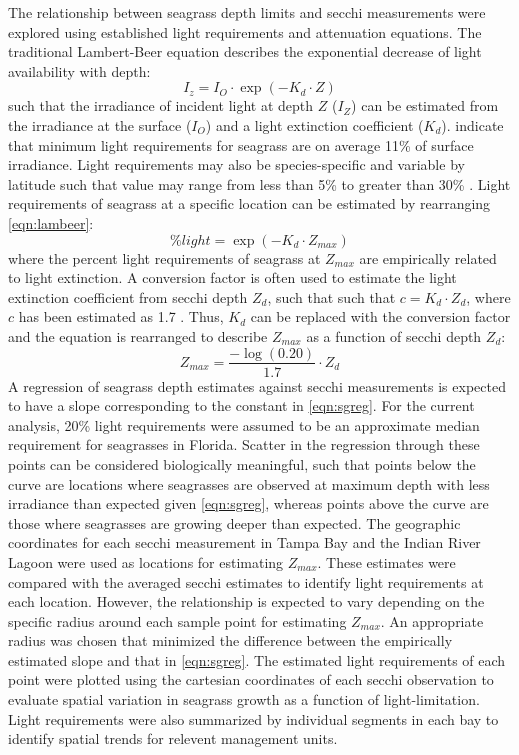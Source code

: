\documentclass[letterpaper,12pt,oneside]{article}\usepackage[]{graphicx}\usepackage[]{color}
\begin{document}
The relationship between seagrass depth limits and secchi measurements were explored using established light requirements and attenuation equations.  The traditional Lambert-Beer equation describes the exponential decrease of light availability with depth:
\begin{equation} \label{eqn:lambeer}
I_{z} = I_{O} \cdot \exp\left(-K_{d} \cdot Z\right)
\end{equation}
\noindent such that the irradiance of incident light at depth $Z$ ($I_{Z}$) can be estimated from the irradiance at the surface ($I_{O}$) and a light extinction coefficient ($K_{d}$). \citet{Duarte91} indicate that minimum light requirements for seagrass are on average 11\% of surface irradiance.  Light requirements may also be species-specific and variable by latitude such that value may range from less than 5\% to greater than 30\% \citep{Dennison93}.  Light requirements of seagrass at a specific location can be estimated by rearranging \cref{eqn:lambeer}:
\begin{equation} \label{eqn:perclight}
\% light = \exp\left(-K_{d} \cdot Z_{max}\right)
\end{equation}
\noindent where the percent light requirements of seagrass at $Z_{max}$ are empirically related to light extinction. A conversion factor is often used to estimate the light extinction coefficient from secchi depth $Z_{d}$, such that such that $c = K_{d} \cdot Z_{d}$, where $c$ has been estimated as 1.7 \citep{Poole29,Idso74}.  Thus, $K_{d}$ can be replaced with the conversion factor and the equation is rearranged to describe $Z_{max}$ as a function of secchi depth $Z_{d}$:
\begin{equation} \label{eqn:sgreg}
Z_{max} = \frac{-\log\left(0.20\right)}{1.7} \cdot Z_{d}
\end{equation}
\noindent A regression of seagrass depth estimates against secchi measurements is expected to have a slope corresponding to the constant in \cref{eqn:sgreg}.  For the current analysis, 20\% light requirements were assumed to be an approximate median requirement for seagrasses in Florida.  Scatter in the regression through these points can be considered biologically meaningful, such that points below the curve are locations where seagrasses are observed at maximum depth with less irradiance than expected given \cref{eqn:sgreg}, whereas points above the curve are those where seagrasses are growing deeper than expected. The geographic coordinates for each secchi measurement in Tampa Bay and the Indian River Lagoon were used as locations for estimating $Z_{max}$.  These estimates were compared with the averaged secchi estimates to identify light requirements at each location.  However, the relationship is expected to vary depending on the specific radius around each sample point for estimating $Z_{max}$.  An appropriate radius was chosen that minimized the difference between the empirically estimated slope and that in \cref{eqn:sgreg}.   The estimated light requirements of each point were plotted using the cartesian coordinates of each secchi observation to evaluate spatial variation in seagrass growth as a function of light-limitation.  Light requirements were also summarized by individual segments in each bay to identify spatial trends for relevent management units.  
\end{document}
